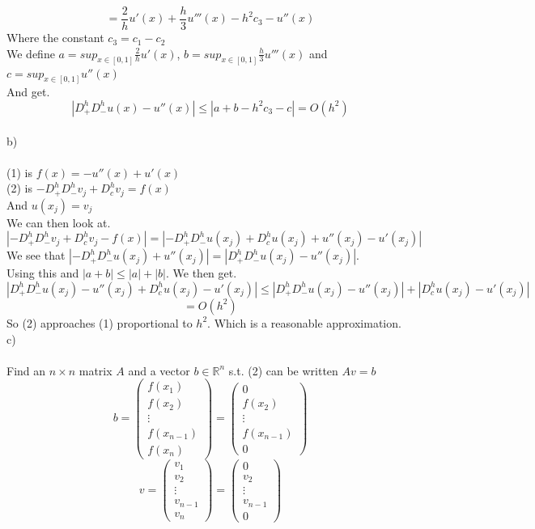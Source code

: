 \documentclass[12pt, letterpaper, twoside]{article}
\begin{document}
$$
= \frac{2}{h} u'(x) + \frac{h}{3} u'''(x) - h^2 c_3 - u''(x)
$$
Where the constant $c_3 = c_1 - c_2$\\
We define $a = sup_{x \in [0,1]} \frac{2}{h} u'(x)$, $b  = sup_{x \in [0,1]} \frac{h}{3} u'''(x)$ and
$c = sup_{x \in [0,1]} u''(x)$\\
And get.
$$
|D_+^h D_-^h u(x) - u''(x)| \leq |a + b - h^2c_3 - c| = O(h^2)
$$
\ \\
b)\\
\ \\
(1) is $f(x) = -u''(x) + u'(x)$\\
(2) is $-D_+^h D_-^h v_j + D_c^h v_j = f(x)$\\
And $u(x_j) = v_j$\\
We can then look at.
$$
|-D_+^h D_-^h v_j + D_c^h v_j - f(x)| 
=
|-D_+^h D_-^h u(x_j) + D_c^h u(x_j) + u''(x_j) - u'(x_j)| 
$$
We see that $ |-D_+^h D_-^h u(x_j) + u''(x_j)| = |D_+^h D_-^h u(x_j) - u''(x_j)|$.\\
Using this and $|a+b| \leq |a| + |b|$. We then get.
$$
|D_+^h D_-^h u(x_j) - u''(x_j) + D_c^h u(x_j) - u'(x_j)| 
\leq 
|D_+^h D_-^h u(x_j) - u''(x_j)| + |D_c^h u(x_j) - u'(x_j)|
$$
$$
= O(h^2)
$$
So (2) approaches (1) proportional to $h^2$. Which is a reasonable approximation. 
\newpage
\ \\
c)\\
\ \\
Find an $n \times n$ matrix $A$ and a vector $b \in \mathbb{R}^n$ s.t. (2) can be written $Av=b$\\
$$
b=
\begin{pmatrix}
f(x_1)\\
f(x_2)\\
\vdots\\
f(x_{n-1})\\
f(x_n)
\end{pmatrix}
=
\begin{pmatrix}
0\\
f(x_2)\\
\vdots\\
f(x_{n-1})\\
0
\end{pmatrix}
$$
$$
v=
\begin{pmatrix}
v_1\\
v_2\\
\vdots\\
v_{n-1}\\
v_n
\end{pmatrix}
=
\begin{pmatrix}
0\\
v_2\\
\vdots\\
v_{n-1}\\
0
\end{pmatrix}
$$
\end{document}
